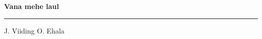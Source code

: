 \documentclass[10pt]{book}
\begin{document}
{
  \samepage
  \raggedbottom
  \raggedright
  \sloppy


  \vspace{0.2in}

  \noindent\begin{minipage}{.1\textwidth}
    \hfill\vspace{0.1in}
  \end{minipage}%
  \noindent\begin{minipage}{.8\textwidth}
    \centering
    \bfseries
    \large Vana mehe laul
  \end{minipage}%
  \noindent\begin{minipage}{.1\textwidth}
      \hfill\vspace{0.1in}
  \end{minipage}

  \nopagebreak[4]
  \vspace{0.1in}
  \nopagebreak[4]
  \hrule height 0.05ex
  \nopagebreak[4]
  \vspace{-0.05in}

  {\footnotesize J. Viiding \hfill O. Ehala }\\
  \vspace{0.01in}



}
\end{document}
